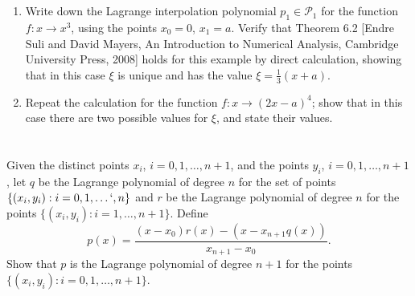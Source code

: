 \documentclass{article}
\begin{document}
\section{}
\begin{enumerate}[label = (\alph*)]
    \item Write down the Lagrange interpolation polynomial $p_1 \in \mathcal{P}_1$ for the function $f:x \to x^3$, using the points $x_0 = 0$, $x_1 = a$. Verify that Theorem 6.2 [Endre Suli and David Mayers, An Introduction to Numerical Analysis, Cambridge University Press, 2008] holds for this example by direct calculation, showing that in this case $\xi$ is unique and has the value $\xi=\frac{1}{3}(x+a)$.
    \item Repeat the calculation for the function $f: x \to (2x-a)^4$; show that in this case there are two possible values for $\xi$, and state their values.
\end{enumerate}
\vspace{10mm}


\section{}
 Given the distinct points $x_i$, $i = 0, 1,\dots, n + 1$, and the points $y_i$, $i = 0, 1, \dots , n + 1$, let $q$ be the Lagrange polynomial of degree $n$ for the set of points $\{(x_i, y_i) : i = 0, 1, \dots` , n\}$ and $r$ be the Lagrange polynomial of degree $n$ for the points $\{(x_i, y_i) : i = 1,\dots, n + 1\}$. Define
 \begin{equation*}
     p(x) = \frac{(x-x_0)r(x)-(x-x_{n+1}q(x))}{x_{n+1}-x_0}.
 \end{equation*}
 Show that $p$ is the Lagrange polynomial of degree $n+1$ for the points $\{(x_i,y_i): i =0,1,\dots, n+1 \}$.
\vspace{10mm}
\end{document}
